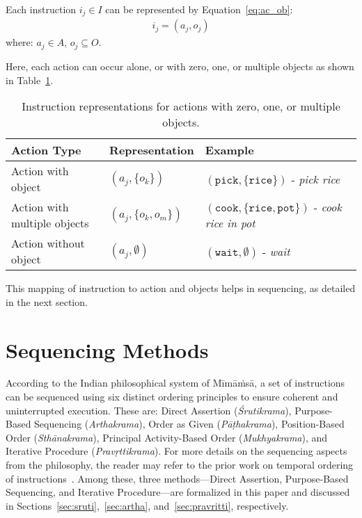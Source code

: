 \documentclass[a4paper,11pt]{lmcs}
\newcommand{\mimamsa}{M\={i}m\={a}\.ms\={a}}
\begin{document}
Each instruction \(i_j \in I\) can be represented by Equation~\ref{eq:ac_ob}:
\begin{eqnarray}
\label{eq:ac_ob}
i_j = (a_j, o_j)
\end{eqnarray}
where: \(a_j \in A\), \(o_j \subseteq O\).

Here, each action can occur alone, or with zero, one, or multiple objects as shown in Table~\ref{tab:ac_ob}.
\begin{table}[h!]
\centering
\begin{tabular}{|l|l|l|}
\hline
\textbf{Action Type}           & \textbf{Representation}             & \textbf{Example}                \\
\hline
Action with object             & \((a_j, \{o_k\})\)                  & \((\texttt{pick}, \{\texttt{rice}\})\) - \textit{pick rice} \\
\hline
Action with multiple objects   & \((a_j, \{o_k, o_m\})\)             & \((\texttt{cook}, \{\texttt{rice}, \texttt{pot}\})\) - \textit{cook rice in pot} \\
\hline
Action without object          & \((a_j, \emptyset)\)                & \((\texttt{wait}, \emptyset)\) - \textit{wait} \\
\hline
\end{tabular}
\caption{Instruction representations for actions with zero, one, or multiple objects.}
\label{tab:ac_ob}
\end{table}

This mapping of instruction to action and objects helps in sequencing, as detailed in the next section.

\section{Sequencing Methods}
\label{sec:seq}
According to the Indian philosophical system of \mimamsa, a set of instructions can be sequenced using six distinct ordering principles to ensure coherent and uninterrupted execution. These are: Direct Assertion (\textit{Śrutikrama}), Purpose-Based Sequencing (\textit{Arthakrama}), Order as Given (\textit{Pāṭhakrama}), Position-Based Order (\textit{Sthānakrama}), Principal Activity-Based Order (\textit{Mukhyakrama}), and Iterative Procedure (\textit{Pravṛttikrama}). For more details on the sequencing aspects from the philosophy, the reader may refer to the prior work on temporal ordering of instructions~\cite{llm_mira}. Among these, three methods—Direct Assertion, Purpose-Based Sequencing, and Iterative Procedure—are formalized in this paper and discussed in Sections~\ref{sec:sruti},~\ref{sec:artha}, and~\ref{sec:pravritti}, respectively.
\end{document}

